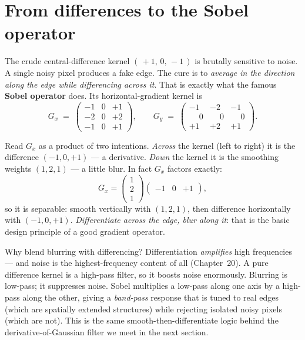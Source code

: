 \section{From differences to the Sobel operator}
\label{ch32:sobel}

The crude central-difference kernel $(\,+1,\,0,\,-1\,)$ is brutally sensitive to noise. A single noisy pixel produces a fake
edge. The cure is to \emph{average in the direction along the edge while
differencing across it}. That is exactly what the famous \textbf{Sobel
operator} does. Its horizontal-gradient kernel is
\begin{equation}
\label{ch32:sobel-x}
G_x \;=\;
\begin{pmatrix} -1 & 0 & +1 \\ -2 & 0 & +2 \\ -1 & 0 & +1 \end{pmatrix},
\qquad
G_y \;=\;
\begin{pmatrix} -1 & -2 & -1 \\ \phantom{-}0 & \phantom{-}0 & \phantom{-}0 \\ +1 & +2 & +1 \end{pmatrix}.
\end{equation}

Read $G_x$ as a product of two intentions. \emph{Across} the kernel (left to
right) it is the difference $(-1,0,+1)$ --- a derivative. \emph{Down} the kernel
it is the smoothing weights $(1,2,1)$ --- a little blur. In fact $G_x$ factors
exactly:
\begin{equation}
\label{ch32:sobel-sep}
G_x =
\begin{pmatrix} 1 \\ 2 \\ 1 \end{pmatrix}
\begin{pmatrix} -1 & 0 & +1 \end{pmatrix},
\end{equation}
so it is separable: smooth vertically with $(1,2,1)$, then difference
horizontally with $(-1,0,+1)$. \emph{Differentiate across the edge, blur along
it}: that is the basic design principle of a good gradient operator.

\begin{whybox}
Why blend blurring with differencing? Differentiation \emph{amplifies} high
frequencies --- and noise is the highest-frequency content of all (Chapter~20).
A pure difference kernel is a high-pass filter, so it boosts noise enormously.
Blurring is low-pass; it suppresses noise. Sobel multiplies a low-pass along
one axis by a high-pass along the other, giving a \emph{band-pass} response
that is tuned to real edges (which are spatially extended structures) while
rejecting isolated noisy pixels (which are not). This is the same
smooth-then-differentiate logic behind the derivative-of-Gaussian filter we
meet in the next section.
\end{whybox}

